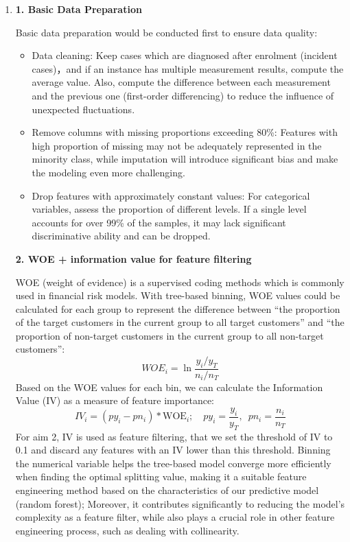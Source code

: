\documentclass[12pt,]{article}
\providecommand{\tightlist}{%
  \setlength{\itemsep}{0pt}\setlength{\parskip}{0pt}}
\begin{document}
\begin{enumerate}
\def\labelenumi{\arabic{enumi}.}
\item
  \textbf{1. Basic Data Preparation}

  Basic data preparation would be conducted first to ensure data
  quality:

  \begin{itemize}
  \tightlist
  \item
    Data cleaning: Keep cases which are diagnosed after enrolment
    (incident cases)，and if an instance has multiple measurement
    results, compute the average value. Also, compute the difference
    between each measurement and the previous one (first-order
    differencing) to reduce the influence of unexpected fluctuations.
  \item
    Remove columns with missing proportions exceeding 80\%: Features
    with high proportion of missing may not be adequately represented in
    the minority class, while imputation will introduce significant bias
    and make the modeling even more challenging.
  \item
    Drop features with approximately constant values: For categorical
    variables, assess the proportion of different levels. If a single
    level accounts for over 99\% of the samples, it may lack significant
    discriminative ability and can be dropped.
  \end{itemize}

  \textbf{2. WOE + information value for feature filtering}

  WOE (weight of evidence) is a supervised coding methods which is
  commonly used in financial risk models. With tree-based binning, WOE
  values could be calculated for each group to represent the difference
  between ``the proportion of the target customers in the current group
  to all target customers'' and ``the proportion of non-target customers
  in the current group to all non-target customers'': \[
  WOE_{i} = \ln{\frac{y_i/y_T}{n_i/n_T}}
  \] Based on the WOE values for each bin, we can calculate the
  Information Value (IV) as a measure of feature importance: \[
  IV_i = ( py_i - pn_i )*\text{WOE}_i; \quad py_i=\frac{y_i}{y_T},\,\,\,pn_i=\frac{n_i}{n_T}
  \] For aim 2, IV is used as feature filtering, that we set the
  threshold of IV to 0.1 and discard any features with an IV lower than
  this threshold. Binning the numerical variable helps the tree-based
  model converge more efficiently when finding the optimal splitting
  value, making it a suitable feature engineering method based on the
  characteristics of our predictive model (random forest); Moreover, it
  contributes significantly to reducing the model's complexity as a
  feature filter, while also plays a crucial role in other feature
  engineering process, such as dealing with collinearity.


\end{enumerate}
\end{document}
